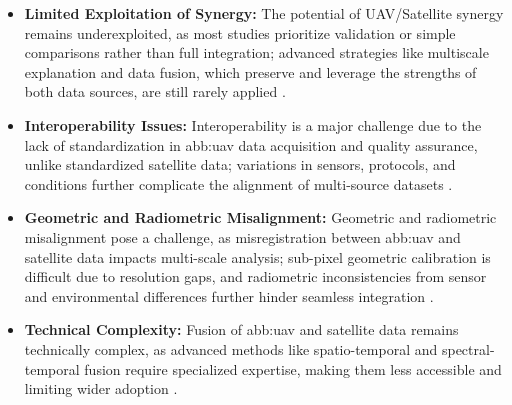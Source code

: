 \begin{itemize}
    \item \textbf{Limited Exploitation of Synergy:} The potential of UAV/Satellite synergy remains underexploited, as most studies prioritize validation or simple comparisons rather than full integration; advanced strategies like multiscale explanation and data fusion, which preserve and leverage the strengths of both data sources, are still rarely applied \parencite{AlvarezVanhard2021}.
  
    \item \textbf{Interoperability Issues:} Interoperability is a major challenge due to the lack of standardization in \gls{abb:uav} data acquisition and quality assurance, unlike standardized satellite data; variations in sensors, protocols, and conditions further complicate the alignment of multi-source datasets \parencite{AlvarezVanhard2021}.
  
    \item \textbf{Geometric and Radiometric Misalignment:} Geometric and radiometric misalignment pose a challenge, as misregistration between \gls{abb:uav} and satellite data impacts multi-scale analysis; sub-pixel geometric calibration is difficult due to resolution gaps, and radiometric inconsistencies from sensor and environmental differences further hinder seamless integration \parencite{AlvarezVanhard2021}.
  
    \item \textbf{Technical Complexity:} Fusion of \gls{abb:uav} and satellite data remains technically complex, as advanced methods like spatio-temporal and spectral-temporal fusion require specialized expertise, making them less accessible and limiting wider adoption \parencite{AlvarezVanhard2021}.
  \end{itemize}
  


